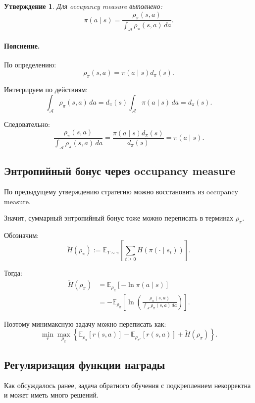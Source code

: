 \documentclass[12pt,a4paper]{article}
\newtheorem{statement}{Утверждение}
\begin{document}
\begin{statement}
Для occupancy measure выполнено:
\[
\pi(a\mid s)
=
\frac{
\rho_\pi(s,a)
}{
\int_{\mathcal A}
\rho_\pi(s,a)
\,da
}.
\]
\end{statement}

\paragraph{Пояснение.}

По определению:
\[
\rho_\pi(s,a)
=
\pi(a\mid s)d_\pi(s).
\]

Интегрируем по действиям:
\[
\int_{\mathcal A}
\rho_\pi(s,a)\,da
=
d_\pi(s)
\int_{\mathcal A}
\pi(a\mid s)\,da
=
d_\pi(s).
\]

Следовательно:
\[
\frac{
\rho_\pi(s,a)
}{
\int_{\mathcal A}
\rho_\pi(s,a)\,da
}
=
\frac{
\pi(a\mid s)d_\pi(s)
}{
d_\pi(s)
}
=
\pi(a\mid s).
\]

\subsection{Энтропийный бонус через occupancy measure}

По предыдущему утверждению стратегию можно восстановить из occupancy measure.

Значит, суммарный энтропийный бонус тоже можно переписать в терминах $\rho_\pi$.

Обозначим:
\[
\widetilde H(\rho_\pi)
:=
\mathbb E_{T\sim\pi}
\left[
\sum_{t\ge 0}
H(\pi(\cdot\mid s_t))
\right].
\]

Тогда:
\[
\begin{aligned}
\widetilde H(\rho_\pi)
&=
\mathbb E_{\rho_\pi}
\left[
-\ln\pi(a\mid s)
\right]
\\
&=
-
\mathbb E_{\rho_\pi}
\left[
\ln
\left(
\frac{
\rho_\pi(s,a)
}{
\int_{\mathcal A}
\rho_\pi(s,a)\,da
}
\right)
\right].
\end{aligned}
\]

Поэтому минимаксную задачу можно переписать как:
\[
\min_r
\max_{\rho_\pi}
\left\{
\mathbb E_{\rho_\pi}
\left[
r(s,a)
\right]
-
\mathbb E_{\rho_{\pi^\ast}}
\left[
r(s,a)
\right]
+
\widetilde H(\rho_\pi)
\right\}.
\]

\subsection{Регуляризация функции награды}

Как обсуждалось ранее, задача обратного обучения с подкреплением некорректна и может иметь много решений.
\end{document}
